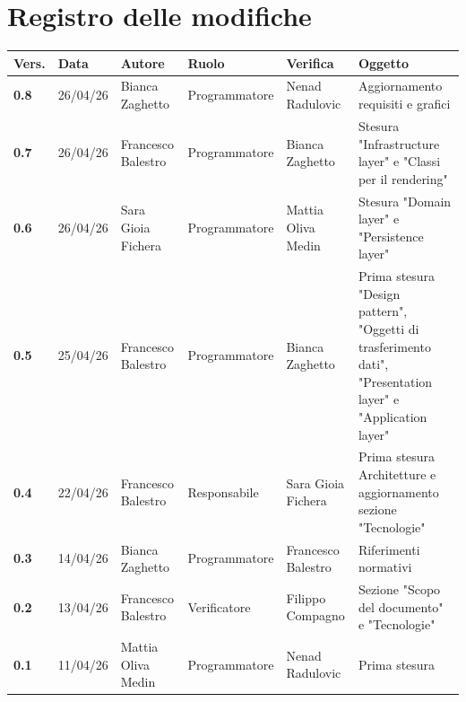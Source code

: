\documentclass[a4paper,12pt]{article}
\begin{document}
    

    \section*{Registro delle modifiche} {
        \begin{table}[h!]
                \begin{tabularx}{\textwidth}{|l|l|l|l|L|L|}
                \hline
                \textbf{Vers.} & \textbf{Data} & \textbf{Autore} & \textbf{Ruolo} & \textbf{Verifica} & \textbf{Oggetto} \\
                \hline
                \textbf{0.8} & 26/04/26 & Bianca Zaghetto & Programmatore & Nenad Radulovic & Aggiornamento requisiti e grafici \\
                \hline
                \textbf{0.7} & 26/04/26 & Francesco Balestro & Programmatore & Bianca Zaghetto & Stesura "Infrastructure layer" e "Classi per il rendering" \\
                \hline
                \textbf{0.6} & 26/04/26 & Sara Gioia Fichera & Programmatore & Mattia Oliva Medin & Stesura "Domain layer" e "Persistence layer" \\
                \hline
                \textbf{0.5} & 25/04/26 & Francesco Balestro & Programmatore & Bianca Zaghetto & Prima stesura "Design pattern", "Oggetti di trasferimento dati", "Presentation layer" e "Application layer" \\
                \hline
                \textbf{0.4} & 22/04/26 & Francesco Balestro & Responsabile & Sara Gioia Fichera & Prima stesura Architetture e aggiornamento sezione "Tecnologie" \\
                \hline
                \textbf{0.3} & 14/04/26 & Bianca Zaghetto & Programmatore & Francesco Balestro & Riferimenti normativi \\
                \hline
                \textbf{0.2} & 13/04/26 & Francesco Balestro & Verificatore & Filippo Compagno & Sezione "Scopo del documento" e "Tecnologie" \\
                \hline
                \textbf{0.1} & 11/04/26 & Mattia Oliva Medin & Programmatore & Nenad Radulovic & Prima stesura \\
                \hline
            \end{tabularx}
        \end{table}
    }
    \newpage
    
    \tableofcontents
    \newpage
\end{document}

